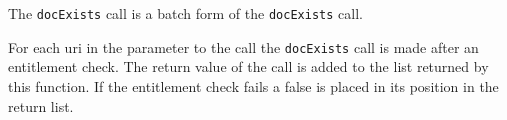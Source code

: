 The \verb+docExists+ call is a batch form of the \verb+docExists+ call.

For each uri in the parameter to the call the \verb+docExists+ call is made
after an entitlement check. The return value of the call is added to the list
returned by this function. If the entitlement check fails a false is placed
in its position in the return list.
